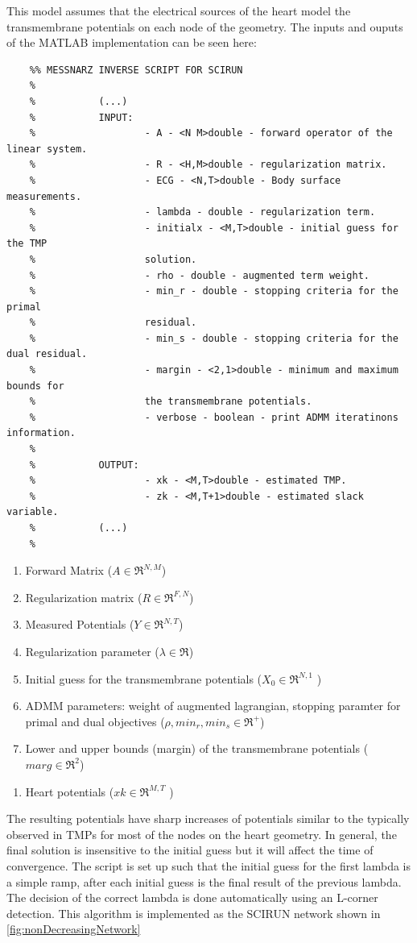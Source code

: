     This model assumes that the electrical sources of the heart model the transmembrane potentials on each node of the geometry. The inputs and ouputs of the MATLAB implementation can be seen here:
    \begin{verbatim}
    %% MESSNARZ INVERSE SCRIPT FOR SCIRUN
    %
    %           (...)
    %			INPUT:
    % 					- A - <N M>double - forward operator of the linear system.
    % 					- R - <H,M>double - regularization matrix.
    % 					- ECG - <N,T>double - Body surface measurements.
    % 					- lambda - double - regularization term.
    % 					- initialx - <M,T>double - initial guess for the TMP
    % 					solution.
    % 					- rho - double - augmented term weight.
    % 					- min_r - double - stopping criteria for the primal
    % 					residual.
    % 					- min_s - double - stopping criteria for the dual residual.
    %					- margin - <2,1>double - minimum and maximum bounds for
    %					the transmembrane potentials.
    % 					- verbose - boolean - print ADMM iteratinons information.
    %
    %			OUTPUT:
    % 					- xk - <M,T>double - estimated TMP.
    % 					- zk - <M,T+1>double - estimated slack variable.
    %           (...)
    %
    \end{verbatim}
    \begin{enumerate}
        \item Forward Matrix ($A\in\Re^{N,M}$)
        \item Regularization matrix ($R\in\Re^{F,N}$)
        \item Measured Potentials ($Y\in\Re^{N,T}$)
        \item Regularization parameter ($\lambda\in\Re$)
        \item Initial guess for the transmembrane potentials ($X_0\in\Re^{N,1}$ )
        \item ADMM parameters: weight of augmented lagrangian, stopping paramter for primal and dual objectives ($\rho, min_r, min_s \in\Re^{+}$)
        \item Lower and upper bounds (margin) of the transmembrane potentials ($marg\in\Re^2$)
    \end{enumerate}
    
    \begin{enumerate}
        \item Heart potentials ($xk\in\Re^{M,T}$ )
    \end{enumerate}
    
    The resulting potentials have sharp increases of potentials similar to the typically observed in TMPs for most of the nodes on the heart geometry.
    In general, the final solution is insensitive to the initial guess but it will affect the time of convergence.
    The script is set up such that the initial guess for the first lambda is a simple ramp, after each initial guess is the final result of the previous lambda. 
    The decision of the correct lambda is done automatically using an L-corner detection.
    This algorithm is implemented as the SCIRUN network shown in \autoref{fig:nonDecreasingNetwork}
    
